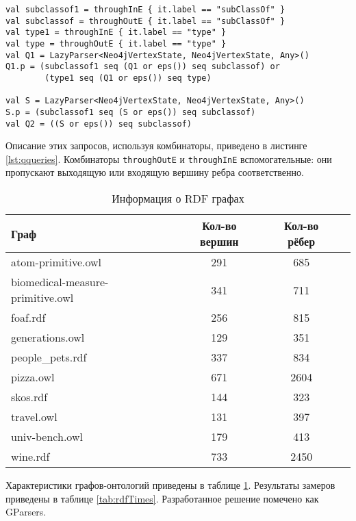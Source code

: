 \begin{lstlisting}[float=h, label=lst:qqueries, caption={Запросы, используя комбинаторы}]
val subclassof1 = throughInE { it.label == "subClassOf" }
val subclassof = throughOutE { it.label == "subClassOf" }
val type1 = throughInE { it.label == "type" }
val type = throughOutE { it.label == "type" }
val Q1 = LazyParser<Neo4jVertexState, Neo4jVertexState, Any>()
Q1.p = (subclassof1 seq (Q1 or eps()) seq subclassof) or
        (type1 seq (Q1 or eps()) seq type)

val S = LazyParser<Neo4jVertexState, Neo4jVertexState, Any>()
S.p = (subclassof1 seq (S or eps()) seq subclassof)
val Q2 = ((S or eps()) seq subclassof)
\end{lstlisting}

Описание этих запросов, используя комбинаторы, приведено в листинге \ref{lst:qqueries}. Комбинаторы \texttt{throughOutE} и \texttt{throughInE} вспомогательные: они пропускают выходящую или входящую вершину ребра соответственно.

\begin{table}[h]
    \caption{Информация о RDF графах}
    \begin{tabular}{|l|c|c|c|}
        \hline
        \textbf{Граф} & \textbf{Кол-во вершин} & \textbf{Кол-во рёбер} \\
        \hline
        atom-primitive.owl & 291 & 685 \\
        biomedical-measure-primitive.owl & 341 & 711 \\
        foaf.rdf & 256 & 815 \\
        generations.owl & 129 & 351 \\
        people\_pets.rdf & 337 & 834 \\
        pizza.owl & 671 & 2604 \\
        skos.rdf & 144 & 323 \\
        travel.owl & 131 & 397 \\
        univ-bench.owl & 179 & 413 \\
        wine.rdf & 733 & 2450 \\
        \hline
\end{tabular}
\label{tab:rdfGraphs}
\end{table}

Характеристики графов-онтологий приведены в таблице \ref{tab:rdfGraphs}. Результаты замеров приведены в таблице \ref{tab:rdfTimes}. Разработанное решение помечено как GParsers.

